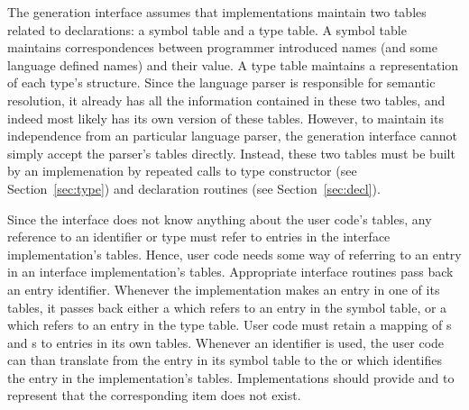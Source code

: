 The generation interface assumes that implementations maintain two
tables related to declarations: a symbol table and a type table.  A
symbol table maintains correspondences between programmer introduced
names (and some language defined names) and their value.  A type table
maintains a representation of each type's structure.  Since the
language parser is responsible for semantic resolution, it already
has all the information contained in these two tables, and indeed most
likely has its own version of these tables.  However, to maintain its
independence from an particular language parser, the generation
interface cannot simply accept the parser's tables directly.  Instead,
these two tables must be built by an implemenation by repeated calls
to type constructor (see Section~\ref{sec:type}) and declaration
routines (see Section~\ref{sec:decl}).  

Since the interface does not know anything about the user code's
tables, any reference to an identifier or type must refer to entries
in the interface implementation's tables.  Hence, user code needs some
way of referring to an entry in an interface implementation's tables.
Appropriate interface routines pass back an entry identifier.
Whenever the implementation makes an entry in one of its tables, it
passes back either a  which refers to an entry in the
symbol table, or a  which refers to an entry in the type
table.  User code must retain a mapping of s and
s to entries in its own tables.  Whenever an identifier
is used, the user code can than translate from the entry in its symbol
table to the  or  which identifies the entry
in the implementation's tables.  Implementations should provide
 and  to represent that the corresponding
item does not exist.


